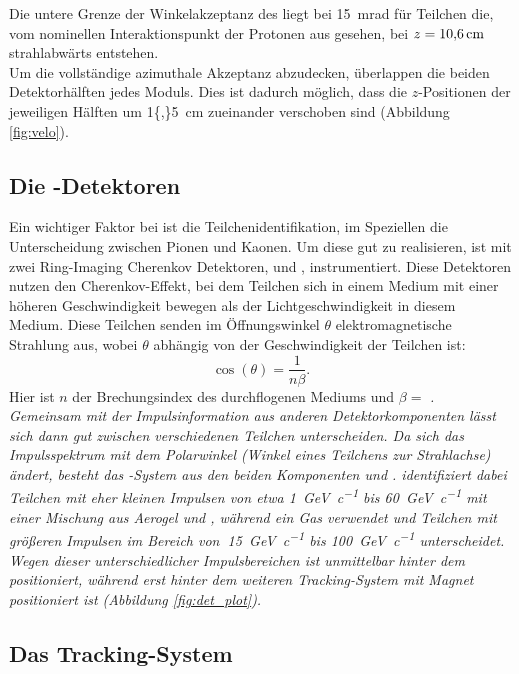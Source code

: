 Die untere Grenze der Winkelakzeptanz des \velo liegt bei \SI{15}{mrad} für Teilchen die, vom nominellen Interaktionspunkt der Protonen aus gesehen, bei $z=\SI{10{,}6}{cm}$ strahlabwärts entstehen.\\
Um die vollständige azimuthale Akzeptanz abzudecken, überlappen die beiden Detektorhälften jedes Moduls. Dies ist dadurch möglich, dass die $z$-Positionen der jeweiligen Hälften um \SI{1{,}5}{cm} zueinander verschoben sind (Abbildung \ref{fig:velo}).
 
\subsection{Die \rich-Detektoren}

Ein wichtiger Faktor bei \lhcb ist die Teilchenidentifikation, im Speziellen die Unterscheidung zwischen Pionen und Kaonen. Um diese gut zu realisieren, ist \lhcb mit zwei Ring-Imaging Cherenkov Detektoren, \richone und \richtwo, instrumentiert. Diese Detektoren nutzen den Cherenkov-Effekt, bei dem Teilchen sich in einem Medium mit einer höheren Geschwindigkeit bewegen als der Lichtgeschwindigkeit in diesem Medium. Diese Teilchen senden im Öffnungswinkel $\theta$ elektromagnetische Strahlung aus, wobei $\theta$ abhängig von der Geschwindigkeit der Teilchen ist:
\begin{equation}
\cos\left(\theta\right)=\frac{1}{n\beta}.
\end{equation}
Hier ist $n$ der Brechungsindex des durchflogenen Mediums und $\beta=$ \itshape{}\upshape. \\ 
Gemeinsam mit der Impulsinformation aus anderen Detektorkomponenten lässt sich dann gut zwischen verschiedenen Teilchen unterscheiden. Da sich das Impulsspektrum mit dem Polarwinkel (Winkel eines Teilchens zur Strahlachse) ändert, besteht das \rich-System aus den beiden Komponenten \richone und \richtwo. \richone identifiziert dabei Teilchen mit eher kleinen Impulsen von etwa \SI{1}{GeV\per c} bis \SI{60}{GeV\per c} \cite{Alves:2008zz} mit einer Mischung aus Aerogel und \cfourften, während \richtwo ein \cffour Gas verwendet und Teilchen mit größeren Impulsen im Bereich von $~$\SI{15}{GeV\per c} bis \SI{100}{GeV\per c} \cite{Alves:2008zz} unterscheidet. Wegen dieser unterschiedlicher Impulsbereichen ist \richone unmittelbar hinter dem \velo positioniert, während \richtwo erst hinter dem weiteren Tracking-System mit Magnet positioniert ist (Abbildung \ref{fig:det_plot}). 

\subsection{Das Tracking-System}


